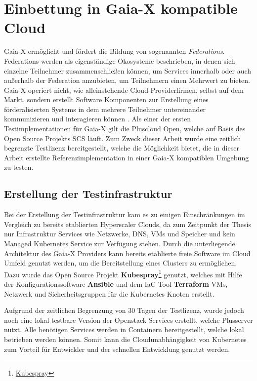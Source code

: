 \chapter{Einbettung in Gaia-X kompatible Cloud}
\label{chapter:gaia-x-einbettung}
Gaia-X ermöglicht und fördert die Bildung von sogenannten \emph{Federations}.
Federations werden als eigenständige Ökosysteme beschrieben, in denen sich einzelne Teilnehmer zusammenschließen können,
um Services innerhalb oder auch außerhalb der Federation anzubieten, um Teilnehmern einen Mehrwert zu bieten.
Gaia-X operiert nicht, wie alleinstehende Cloud-Providerfirmen, selbst auf dem Markt, sondern erstellt
Software Komponenten zur Erstellung eines förderalisierten Systems in dem mehrere Teilnehmer
untereinander kommunizieren und interagieren können \cite{GXFS2021}.
Als einer der ersten Testimplementationen für Gaia-X gilt die Pluscloud Open,
welche auf Basis des Open Source Projekts \ac{SCS} läuft.
Zum Zweck dieser Arbeit wurde eine zeitlich begrenzte Testlizenz bereitgestellt,
welche die Möglichkeit bietet, die in dieser Arbeit erstellte Referenzimplementation
in einer Gaia-X kompatiblen Umgebung zu testen.


\section{Erstellung der Testinfrastruktur}
\label{sec:gaia-x-einbettung:erstellung-testinfra}
Bei der Erstellung der Testinfrastruktur kam es zu einigen Einschränkungen im Vergleich zu bereits etablierten Hyperscaler Clouds,
da zum Zeitpunkt der Thesis nur Infrastruktur Services wie Netzwerke, DNS, \acp{VM} und Speicher
und kein Managed Kubernetes Service zur Verfügung stehen.
Durch die unterliegende Architektur des Gaia-X Providers kann bereits etablierte freie Software
im Cloud Umfeld genutzt werden, um die Bereitstellung eines Clusters zu ermöglichen.
Dazu wurde das Open Source Projekt \textbf{Kubespray}\footnote{\href{https://github.com/kubernetes-sigs/kubespray}{Kubespray}} genutzt,
welches mit Hilfe der Konfigurationssoftware \textbf{Ansible} und dem \ac{IaC} Tool \textbf{Terraform}
\acp{VM}, Netzwerk und Sicherheitsgruppen für die Kubernetes Knoten erstellt.

Aufgrund der zeitlichen Begrenzung von 30 Tagen der Testlizenz, wurde jedoch noch eine lokal
testbare Version der Openstack Services erstellt, welche Plusserver nutzt.
Alle benötigen Services werden in Containern bereitgestellt, welche lokal 
betrieben werden können.
Somit kann die Cloudunabhängigkeit von Kubernetes zum Vorteil für Entwickler und der schnellen Entwicklung genutzt werden.


